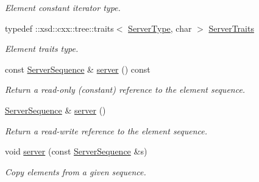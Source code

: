 \begin{DoxyCompactItemize}
\begin{DoxyCompactList}\small\item\em Element constant iterator type. \item\end{DoxyCompactList}\item 
\hypertarget{classopenstack_1_1xml_1_1Servers_a355623818998772756ee07cb5a39bf53}{
typedef ::xsd::cxx::tree::traits$<$ \hyperlink{classopenstack_1_1xml_1_1Server}{ServerType}, char $>$ \hyperlink{classopenstack_1_1xml_1_1Servers_a355623818998772756ee07cb5a39bf53}{ServerTraits}}
\label{classopenstack_1_1xml_1_1Servers_a355623818998772756ee07cb5a39bf53}

\begin{DoxyCompactList}\small\item\em Element traits type. \item\end{DoxyCompactList}\item 
const \hyperlink{classopenstack_1_1xml_1_1Servers_a9cc28e68df0ebb654db381f4bc6b43e0}{ServerSequence} \& \hyperlink{classopenstack_1_1xml_1_1Servers_a964e5b8e2583072da1efe01f85c778ba}{server} () const 
\begin{DoxyCompactList}\small\item\em Return a read-\/only (constant) reference to the element sequence. \item\end{DoxyCompactList}\item 
\hyperlink{classopenstack_1_1xml_1_1Servers_a9cc28e68df0ebb654db381f4bc6b43e0}{ServerSequence} \& \hyperlink{classopenstack_1_1xml_1_1Servers_aa8e58f8966ac6dc90d7b51c3bf4b7bd5}{server} ()
\begin{DoxyCompactList}\small\item\em Return a read-\/write reference to the element sequence. \item\end{DoxyCompactList}\item 
void \hyperlink{classopenstack_1_1xml_1_1Servers_abe8f589285ac400426ab41115fe60f25}{server} (const \hyperlink{classopenstack_1_1xml_1_1Servers_a9cc28e68df0ebb654db381f4bc6b43e0}{ServerSequence} \&s)
\begin{DoxyCompactList}\small\item\em Copy elements from a given sequence. \item\end{DoxyCompactList}\end{DoxyCompactItemize}
